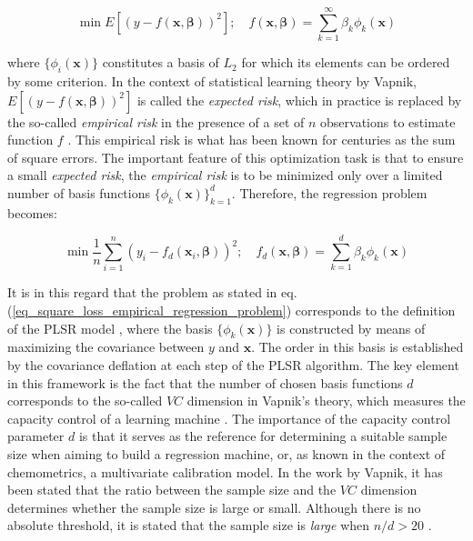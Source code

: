 \documentclass[journal=ancham,manuscript=article]{achemso}
\begin{document}
\begin{equation}
    \min E \left[ (y-f(\mathbf{x}, \boldsymbol{\beta}))^2\right]; \quad f(\mathbf{x}, \boldsymbol{\beta}) = \sum_{k=1}^{\infty} \beta_k \phi_{k}(\mathbf{x})
    \label{eq_general_regression_problem}
\end{equation}

where $\{\phi_{i}(\mathbf{x})\}$ constitutes a basis of $L_2$ for which its elements can be ordered by some criterion. In the context of statistical learning theory by Vapnik, $E \left[ (y-f(\mathbf{x}, \boldsymbol{\beta}))^2\right]$ is called the \emph{expected risk}, which in practice is replaced by the so-called \emph{empirical risk} in the presence of a set of $n$ observations to estimate function $f$ \cite{Vapnik2000}. This empirical risk is what has been known for centuries as the sum of square errors. The important feature of this optimization task is that to ensure a small \emph{expected risk}, the \emph{empirical risk} is to be minimized only over a limited number of basis functions $\{\phi_{k}(\mathbf{x})\}_{k=1}^d$. Therefore, the regression problem becomes:

\begin{equation}
    \min \frac{1}{n} \sum_{i=1}^n (y_i-f_d(\mathbf{x}_i, \boldsymbol{\beta}))^2; \quad f_d(\mathbf{x}, \boldsymbol{\beta}) = \sum_{k=1}^{d} \beta_k \phi_{k}(\mathbf{x})
    \label{eq_square_loss_empirical_regression_problem}
\end{equation}

It is in this regard that the problem as stated in eq. (\ref{eq_square_loss_empirical_regression_problem}) corresponds to the definition of the PLSR model  \cite{Stone1990}, where the basis $\{\phi_{k}(\mathbf{x})\}$ is constructed by means of maximizing the covariance between $y$ and $\mathbf{x}$. The order in this basis is established by the covariance deflation at each step of the PLSR algorithm. The key element in this framework is the fact that the number of chosen basis functions $d$ corresponds to the so-called $VC$ dimension in Vapnik's theory, which measures the capacity control of a learning machine \cite{Vapnik2019}. The importance of the capacity control parameter $d$ is that it serves as the reference for determining a suitable sample size when aiming to build a regression machine, or, as known in the context of chemometrics, a multivariate calibration model. In the work by Vapnik, it has been stated that the ratio between the sample size and the $VC$ dimension determines whether the sample size is large or small. Although there is no absolute threshold, it is stated that the sample size is \emph{large} when  $n/d>20$ \cite{Vapnik2000}.
\end{document}
